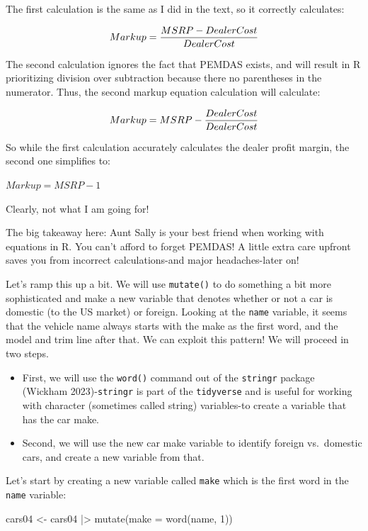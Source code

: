 \documentclass[
  letterpaper,
]{book}
\newenvironment{Shaded}{\begin{snugshade}}{\end{snugshade}}
\newcommand{\AttributeTok}[1]{\textcolor[rgb]{0.40,0.45,0.13}{#1}}
\newcommand{\DecValTok}[1]{\textcolor[rgb]{0.68,0.00,0.00}{#1}}
\newcommand{\FunctionTok}[1]{\textcolor[rgb]{0.28,0.35,0.67}{#1}}
\newcommand{\NormalTok}[1]{\textcolor[rgb]{0.00,0.23,0.31}{#1}}
\newcommand{\OtherTok}[1]{\textcolor[rgb]{0.00,0.23,0.31}{#1}}
\newcommand{\SpecialCharTok}[1]{\textcolor[rgb]{0.37,0.37,0.37}{#1}}
\providecommand{\tightlist}{%
  \setlength{\itemsep}{0pt}\setlength{\parskip}{0pt}}\usepackage{longtable,booktabs,array}
\begin{document}
\begin{tcolorbox}
The first calculation is the same as I did in the text, so it correctly
calculates:

\[Markup = \frac{MSRP - Dealer \space Cost}{Dealer \space Cost}\]

The second calculation ignores the fact that PEMDAS exists, and will
result in R prioritizing division over subtraction because there no
parentheses in the numerator. Thus, the second markup equation
calculation will calculate:

\[Markup = MSRP -\frac{Dealer \space Cost}{Dealer \space Cost}\]

So while the first calculation accurately calculates the dealer profit
margin, the second one simplifies to:

\(Markup = MSRP - 1\)

Clearly, not what I am going for!

The big takeaway here: Aunt Sally is your best friend when working with
equations in R. You can't afford to forget PEMDAS! A little extra care
upfront saves you from incorrect calculations-and major headaches-later
on!

\end{tcolorbox}

Let's ramp this up a bit. We will use \texttt{mutate()} to do something
a bit more sophisticated and make a new variable that denotes whether or
not a car is domestic (to the US market) or foreign. Looking at the
\texttt{name} variable, it seems that the vehicle name always starts
with the make as the first word, and the model and trim line after that.
We can exploit this pattern! We will proceed in two steps.

\begin{itemize}
\tightlist
\item
  First, we will use the \texttt{word()} command out of the
  \texttt{stringr} package (Wickham 2023)-\texttt{stringr} is part of
  the \texttt{tidyverse} and is useful for working with character
  (sometimes called string) variables-to create a variable that has the
  car make.
\item
  Second, we will use the new car make variable to identify foreign
  vs.~domestic cars, and create a new variable from that.
\end{itemize}

Let's start by creating a new variable called \texttt{make} which is the
first word in the \texttt{name} variable:

\begin{Shaded}
\begin{Highlighting}[]
\NormalTok{cars04 }\OtherTok{\textless{}{-}}\NormalTok{ cars04 }\SpecialCharTok{|\textgreater{}} 
  \FunctionTok{mutate}\NormalTok{(}\AttributeTok{make =} \FunctionTok{word}\NormalTok{(name, }\DecValTok{1}\NormalTok{))}
\end{Highlighting}
\end{Shaded}
\end{document}
